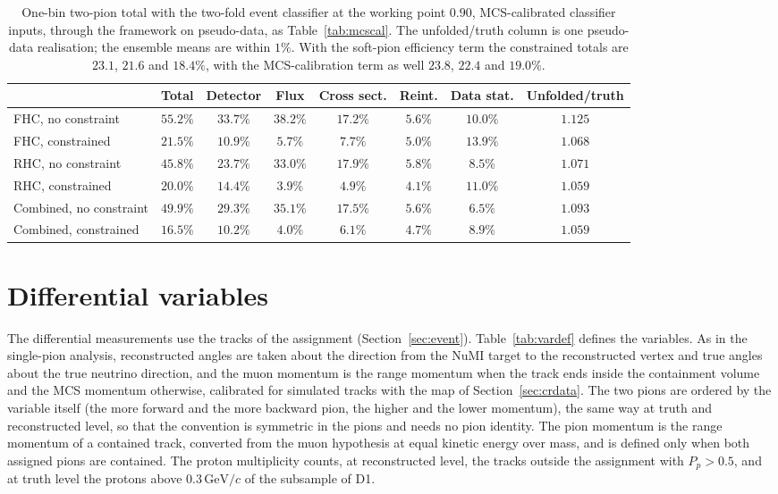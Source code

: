 \documentclass[11pt,a4paper]{article}
\newcommand{\GeVc}{\,\text{GeV}\!/c}
\begin{document}
\begin{table}[H]
  \centering
  \caption{One-bin two-pion total with the two-fold event classifier at the working point $0.90$, MCS-calibrated
    classifier inputs, through the framework on pseudo-data, as Table~\ref{tab:mcscal}. The unfolded/truth column is one
    pseudo-data realisation; the ensemble means are within $1\%$. With the soft-pion efficiency term the constrained
    totals are $23.1$, $21.6$ and $18.4\%$, with the MCS-calibration term as well $23.8$, $22.4$ and $19.0\%$.}
  \label{tab:tf_total}
  \footnotesize\setlength{\tabcolsep}{3pt}
  \begin{tabular}{lccccccc}
    \toprule
    & Total & Detector & Flux & Cross sect. & Reint. & Data stat. & Unfolded/truth \\
    \midrule
    FHC, no constraint       & $55.2\%$ & $33.7\%$ & $38.2\%$ & $17.2\%$ & $5.6\%$ & $10.0\%$ & $1.125$ \\
    FHC, constrained         & $21.5\%$ & $10.9\%$ & $5.7\%$  & $7.7\%$  & $5.0\%$ & $13.9\%$ & $1.068$ \\
    RHC, no constraint       & $45.8\%$ & $23.7\%$ & $33.0\%$ & $17.9\%$ & $5.8\%$ & $8.5\%$  & $1.071$ \\
    RHC, constrained         & $20.0\%$ & $14.4\%$ & $3.9\%$  & $4.9\%$  & $4.1\%$ & $11.0\%$ & $1.059$ \\
    Combined, no constraint  & $49.9\%$ & $29.3\%$ & $35.1\%$ & $17.5\%$ & $5.6\%$ & $6.5\%$  & $1.093$ \\
    Combined, constrained    & $16.5\%$ & $10.2\%$ & $4.0\%$  & $6.1\%$  & $4.7\%$ & $8.9\%$  & $1.059$ \\
    \bottomrule
  \end{tabular}
\end{table}

\section{Differential variables}
\label{sec:variables}

The differential measurements use the tracks of the assignment (Section~\ref{sec:event}). Table~\ref{tab:vardef}
defines the variables. As in the single-pion analysis, reconstructed angles are taken about the direction from the
NuMI target to the reconstructed vertex and true angles about the true neutrino direction, and the muon momentum is
the range momentum when the track ends inside the containment volume and the MCS momentum otherwise, calibrated for
simulated tracks with the map of Section~\ref{sec:crdata}. The two pions are ordered by the variable itself (the more
forward and the more backward pion, the higher and the lower momentum), the same way at truth and reconstructed
level, so that the convention is symmetric in the pions and needs no pion identity. The pion momentum is the range
momentum of a contained track, converted from the muon hypothesis at equal kinetic energy over mass, and is defined
only when both assigned pions are contained. The proton multiplicity counts, at reconstructed level, the tracks
outside the assignment with $P_p>0.5$, and at truth level the protons above $0.3\GeVc$ of the subsample of D1.
\end{document}
